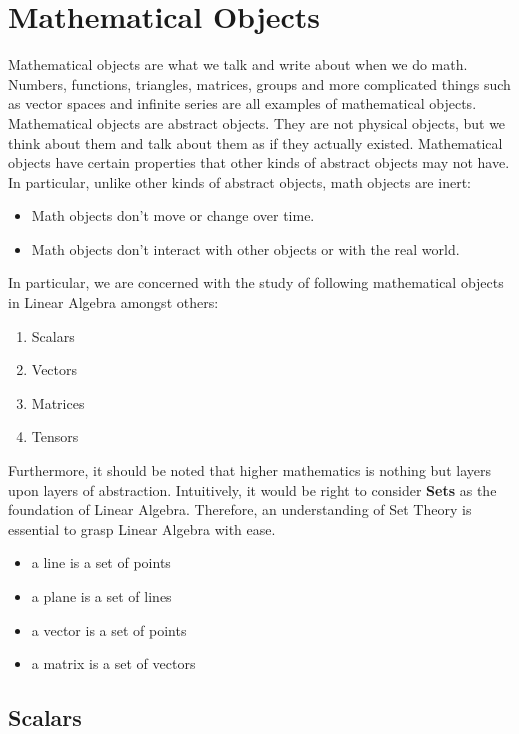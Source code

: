 \chapter{Mathematical Objects}

Mathematical objects are what we talk and write about when we do math. Numbers, functions, triangles, matrices, groups and more complicated things such as vector spaces and infinite series are all examples of mathematical objects. 
Mathematical objects are abstract objects. They are not physical objects, but we think about them and talk about them as if they actually existed. 
Mathematical objects have certain properties that other kinds of abstract objects may not have. In particular, unlike other kinds of abstract objects, math objects are inert:
\begin{itemize}
    \item Math objects don't move or change over time.
    \item Math objects don't interact with other objects or with the real world.
\end{itemize}

In particular, we are concerned with the study of following mathematical objects in Linear Algebra amongst others:
\begin{enumerate}
    \item Scalars
    \item Vectors
    \item Matrices
    \item Tensors
\end{enumerate}

Furthermore, it should be noted that higher mathematics is nothing but layers upon layers of abstraction. Intuitively, it would be right to consider \textbf{Sets} as the foundation of Linear Algebra. Therefore, an understanding of Set Theory is essential to grasp Linear Algebra with ease.
\begin{itemize}
    \item a line is a set of points
    \item a plane is a set of lines
    \item a vector is a set of points
    \item a matrix is a set of vectors
\end{itemize}

\section{Scalars}

